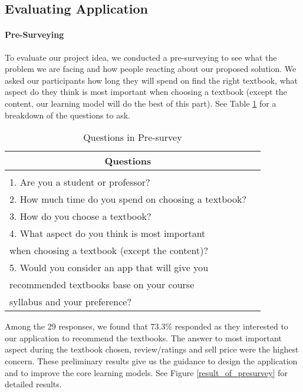 %
\subsection{Evaluating Application}
\paragraph{Pre-Surveying}
To evaluate our project idea, we conducted a pre-surveying to see what the problem we are facing and how people reacting about our proposed solution. We asked our participants how long they will spend on find the right textbook, what aspect do they think is most important when choosing a textbook (except the content, our learning model will do the best of this part). See Table \ref{Pre-survey} for a breakdown of the questions to ask.

\begin{table}[ht] 
\caption{Questions in Pre-survey}
\label{Pre-survey}
\begin{center}
\begin{tabular}{ll}
\multicolumn{1}{c}{\bf Questions} 
\\ \hline \\
1. Are you a student or professor?\\
2. How much time do you spend on choosing a textbook?\\
3. How do you choose a textbook?\\
4. What aspect do you think is most important\\
when choosing a textbook (except the content)? \\
5. Would you consider an app that will give you \\
recommended textbooks base on your course \\
syllabus and your preference? \\
\end{tabular}
\end{center}
\end{table}
Among the 29 responses, we found that 73.3\% responded as they interested to our application to recommend the textbooks. The answer to most important aspect during the textbook chosen, review/ratings and sell price were the highest concern. These preliminary results give us the guidance to design the application and to improve the core learning models. See Figure \ref{result_of_presurvey} for detailed results.


